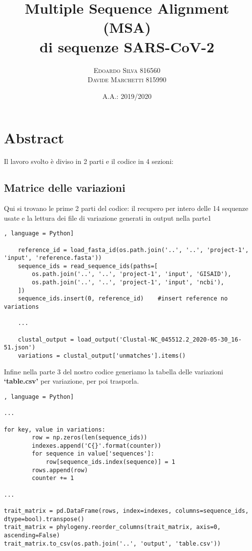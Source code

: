 \documentclass[11pt,italian]{article}
\title{Multiple Sequence Alignment (MSA) \\ di sequenze SARS-CoV-2}
\date{A.A.: 2019/2020}
\author{
    \textsc{Edoardo Silva} 816560 \\
    \textsc{Davide Marchetti} 815990
}
\begin{document}
\maketitle

\section{Abstract}
Il lavoro svolto è diviso in 2 parti e il codice in 4 sezioni:
\subsection{Matrice delle variazioni}
Qui si trovano le prime 2 parti del codice: il recupero per intero delle 14 sequenze usate e la lettura dei file di variazione generati in output nella parte1
\begin{lstlisting}[basicstyle=\small\ttfamily,caption=Porzione di ciclo,label=code:Read fasta = [], language = Python]

    reference_id = load_fasta_id(os.path.join('..', '..', 'project-1', 'input', 'reference.fasta'))
    sequence_ids = read_sequence_ids(paths=[
        os.path.join('..', '..', 'project-1', 'input', 'GISAID'),
        os.path.join('..', '..', 'project-1', 'input', 'ncbi'),
    ])
    sequence_ids.insert(0, reference_id)    #insert reference no variations
    
    ...

    clustal_output = load_output('Clustal-NC_045512.2_2020-05-30_16-51.json')
    variations = clustal_output['unmatches'].items()

\end{lstlisting}
\newpage
Infine nella parte 3 del nostro codice generiamo la tabella delle variazioni \textbf{`table.csv'} per variazione, per poi trasporla.

\begin{lstlisting}[basicstyle=\small\ttfamily,caption=Porzione di ciclo,label=code:creation table.csv = [], language = Python]

...

for key, value in variations:
        row = np.zeros(len(sequence_ids))
        indexes.append('C{}'.format(counter))
        for sequence in value['sequences']:
            row[sequence_ids.index(sequence)] = 1
        rows.append(row)
        counter += 1
        
...

trait_matrix = pd.DataFrame(rows, index=indexes, columns=sequence_ids, dtype=bool).transpose()
trait_matrix = phylogeny.reorder_columns(trait_matrix, axis=0, ascending=False)
trait_matrix.to_csv(os.path.join('..', 'output', 'table.csv'))

\end{lstlisting}
\end{document}
